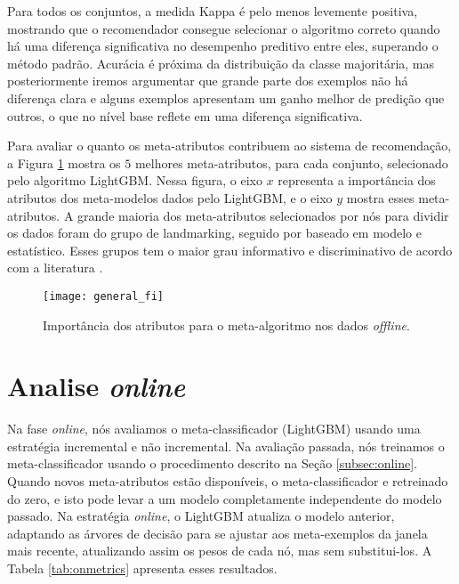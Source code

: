 Para todos os conjuntos, a medida Kappa é pelo menos levemente positiva, mostrando que o recomendador consegue selecionar o algoritmo correto quando há uma diferença significativa no desempenho preditivo entre eles, superando o método padrão. Acurácia é próxima da distribuição da classe majoritária, mas posteriormente iremos argumentar que grande parte dos exemplos não há diferença clara e alguns exemplos apresentam um ganho melhor de predição que outros, o que no nível base reflete em uma diferença significativa.

Para avaliar o quanto os meta-atributos contribuem ao sistema de recomendação, a Figura \ref{fig:fi} mostra os $5$ melhores meta-atributos, para cada conjunto, selecionado pelo algoritmo LightGBM. Nessa figura, o eixo $x$ representa a importância dos atributos dos meta-modelos dados pelo LightGBM, e o eixo $y$ mostra esses meta-atributos. A grande maioria dos meta-atributos selecionados por nós para dividir os dados foram do grupo de landmarking, seguido por baseado em modelo e estatístico. Esses grupos tem o maior grau informativo e discriminativo de acordo com a literatura \cite{Rivolli2018}.

\begin{figure}[ht]
    \centering
    \texttt{[image: general\_fi]}
    \caption{Importância dos atributos para o meta-algoritmo nos dados \textit{offline}.}
    \label{fig:fi}
\end{figure}


\section{Analise \textit{online}}

Na fase \textit{online}, nós avaliamos o meta-classificador (LightGBM) usando uma estratégia incremental e não incremental. Na avaliação passada, nós treinamos o meta-classificador usando o procedimento descrito na Seção \ref{subsec:online}. Quando novos meta-atributos estão disponíveis, o meta-classificador e retreinado do zero, e isto pode levar a um modelo completamente independente do modelo passado. Na estratégia \textit{online}, o LightGBM atualiza o modelo anterior, adaptando as árvores de decisão para se ajustar aos meta-exemplos da janela mais recente, atualizando assim os pesos de cada nó, mas sem substitui-los. A Tabela \ref{tab:onmetrics} apresenta esses resultados.


